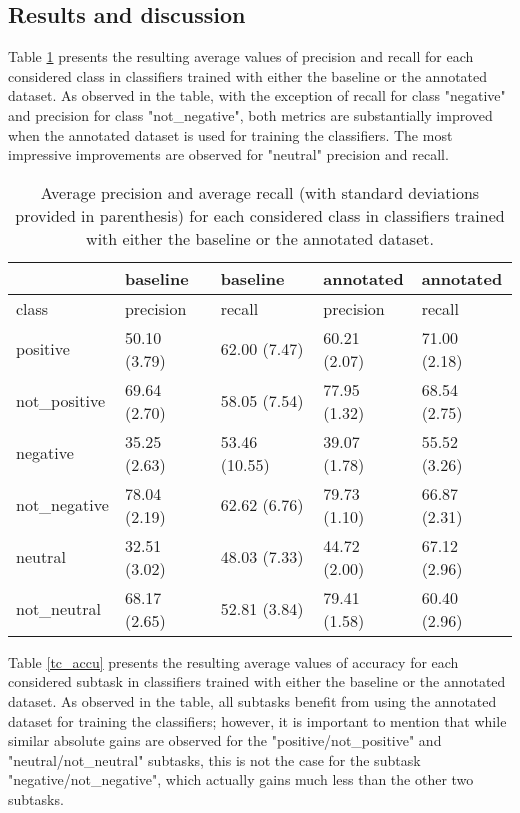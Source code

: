 \subsection{Results and discussion}
Table \ref{tc_pre_rec} presents the resulting average values of precision and recall for each considered class 
in classifiers trained with either the baseline or the annotated dataset. As observed in the table, with the
exception of recall for class "negative" and precision for class "not_negative", both metrics are substantially 
improved when the annotated dataset is used for training the classifiers. The most impressive improvements
are observed for "neutral" precision and recall. 

\begin{table}
\begin{tabular}{|l|l|l|l|l|}
\hline
&baseline &baseline &annotated &annotated \\ 
\hline
class &precision &recall &precision &recall \\ 
\hline
positive &50.10 (3.79) &62.00 (7.47) &60.21 (2.07) &71.00 (2.18) \\ 
\hline
not_positive &69.64 (2.70) &58.05 (7.54) &77.95 (1.32) &68.54 (2.75) \\ 
\hline
negative &35.25 (2.63) &53.46 (10.55) &39.07 (1.78) &55.52 (3.26) \\ 
\hline
not_negative &78.04 (2.19) &62.62 (6.76) &79.73 (1.10) &66.87 (2.31) \\ 
\hline
neutral &32.51 (3.02) &48.03 (7.33) &44.72 (2.00) &67.12 (2.96) \\ 
\hline
not_neutral &68.17 (2.65) &52.81 (3.84) &79.41 (1.58) &60.40 (2.96) \\ 
\hline
\end{tabular}
\caption{Average precision and average recall (with standard deviations provided in parenthesis) 
for each considered class in classifiers trained with either the baseline or the annotated dataset.}
\label{tc_pre_rec}
\end{table}

Table \ref{tc_accu} presents the resulting average values of accuracy for each considered subtask 
in classifiers trained with either the baseline or the annotated dataset. As observed in the table,
all subtasks benefit from using the annotated dataset for training the classifiers; however, it is 
important to mention that while similar absolute gains are observed for the "positive/not_positive" 
and "neutral/not_neutral" subtasks, this is not the case for the subtask "negative/not_negative", 
which actually gains much less than the other two subtasks.

